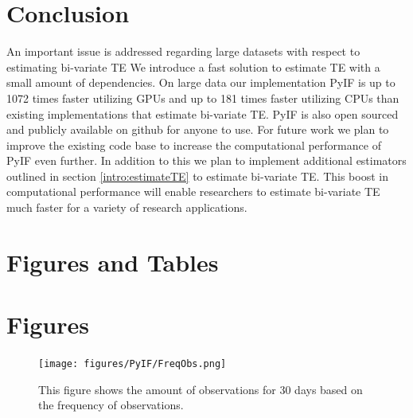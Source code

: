 \section{Conclusion}

An important issue is addressed regarding large datasets with respect to estimating bi-variate TE We introduce a fast solution to estimate TE with a small amount of dependencies. On large data our implementation PyIF is up to 1072 times faster utilizing GPUs and up to 181 times faster utilizing CPUs than existing implementations that estimate bi-variate TE.  PyIF is also open sourced and publicly available on github for anyone to use.  For future work we plan to improve the existing code base to increase the computational performance of PyIF even further. In addition to this we plan to implement additional estimators outlined in section  \ref{intro:estimateTE} to estimate bi-variate TE. This boost in computational performance will enable researchers to estimate bi-variate TE much faster for a variety of research applications. 

\clearpage
\section{Figures and Tables}

\section{Figures}


\begin{figure}
  \centerline{\texttt{[image: figures/PyIF/FreqObs.png]}}
  \caption{This figure shows the amount of observations for 30 days based on the frequency of observations.}
  \label{fig:FreqObs}
\end{figure}

